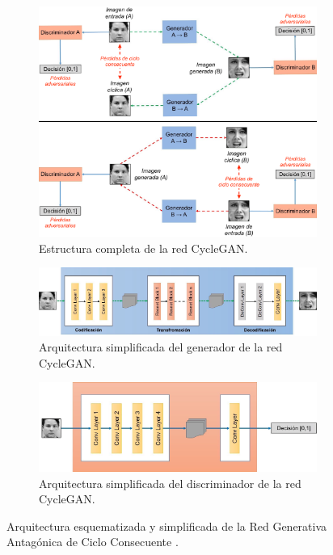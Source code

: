 \begin{figure}
    \centering
    \begin{subfigure}[t]{0.8\textwidth}
      \centering
      \includegraphics[width=\linewidth]{Images/CycleGANArchitecture.png}
      \caption{Estructura completa de la red CycleGAN.}
      \label{fig:CycleGAN_general}
    \end{subfigure}
    
    \vspace{1cm}
    \begin{subfigure}[t]{0.8\textwidth}
      \centering
      \includegraphics[width=\linewidth]{Images/Generator.png}
      \caption{Arquitectura simplificada del generador de la red CycleGAN.}
      \label{fig:Generator}
    \end{subfigure}
    
    \vspace{1cm}
    \begin{subfigure}[t]{.7\textwidth}
      \centering
      \includegraphics[width=\linewidth]{Images/Discriminator.png}
      \caption{Arquitectura simplificada del discriminador de la red CycleGAN.}
      \label{fig:Discriminator}
    \end{subfigure}
    \caption{Arquitectura esquematizada y simplificada de la Red Generativa Antagónica de Ciclo Consecuente \cite{img:CycleGAN}.}
    \label{fig:CycleGANArchitecture}
\end{figure}

